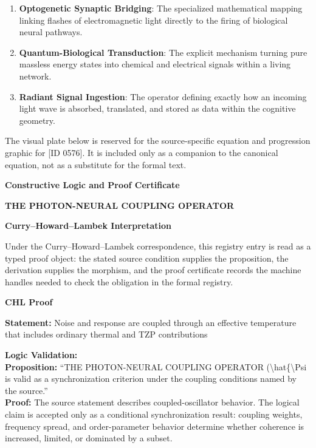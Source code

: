 \begin{enumerate}[leftmargin=1.6em,itemsep=6pt,topsep=4pt]
\item \textbf{Optogenetic Synaptic Bridging}: The specialized mathematical mapping linking flashes of electromagnetic light directly to the firing of biological neural pathways.
\item \textbf{Quantum-Biological Transduction}: The explicit mechanism turning pure massless energy states into chemical and electrical signals within a living network.
\item \textbf{Radiant Signal Ingestion}: The operator defining exactly how an incoming light wave is absorbed, translated, and stored as data within the cognitive geometry.
\end{enumerate}

\begingroup\footnotesize\sloppy
The visual plate below is reserved for the source-specific equation and progression graphic for [ID 0576]. It is included only as a companion to the canonical equation, not as a substitute for the formal text.
\par\endgroup
\ifTZPDarkEdition
{}
\fi

\clearpage
\begingroup\tzpsupportsetup
\noindent\textbf{\fontsize{10.8pt}{12.8pt}\selectfont [ID 0576] Constructive Logic and Proof Certificate}\par
\noindent\textbf{\fontsize{10pt}{12pt}\selectfont THE PHOTON-NEURAL COUPLING OPERATOR}\par
\vspace{0.45em}
\begingroup
\footnotesize
\setlength{\parskip}{0.22em}
\setlength{\parindent}{0pt}
\noindent\textbf{Curry--Howard--Lambek Interpretation}\par
Under the Curry--Howard--Lambek correspondence, this registry entry is read as a typed proof
object: the stated source condition supplies the proposition, the derivation supplies the
morphism, and the proof certificate records the machine handles needed to check the obligation
in the formal registry.

\vspace{0.45em}
\noindent\textbf{CHL Proof}\par
\textbf{Statement:} Noise and response are coupled through an effective temperature that includes ordinary
thermal and TZP contributions

\textbf{Logic Validation:}\\
\textbf{Proposition:} ``THE PHOTON-NEURAL COUPLING OPERATOR (\textbackslash{}hat\{\textbackslash{}Psi is valid as a synchronization criterion
under the coupling conditions named by the source.''\\
\textbf{Proof:} The source statement describes coupled-oscillator behavior. The logical claim is
accepted only as a conditional synchronization result: coupling weights, frequency
spread, and order-parameter behavior determine whether coherence is increased, limited,
or dominated by a subset.

